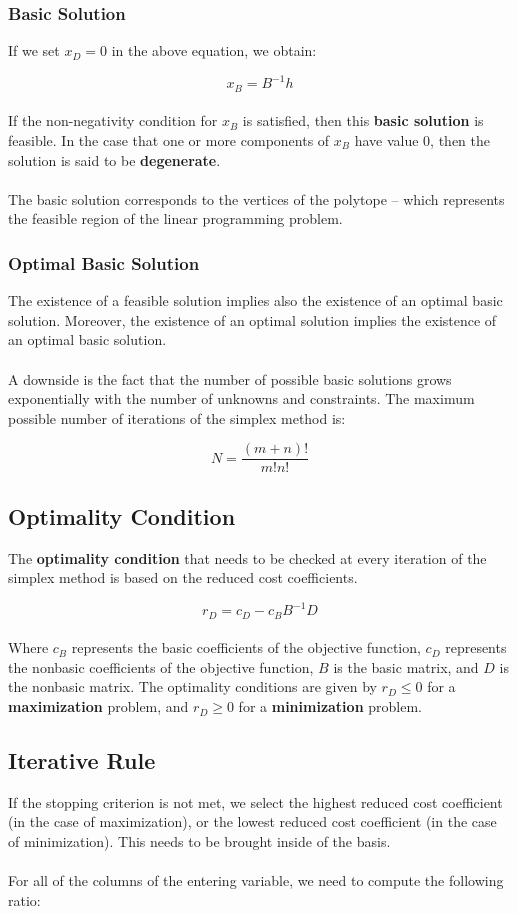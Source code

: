 \documentclass{article}
\begin{document}
\subsubsection{Basic Solution}
If we set $x_D = 0$ in the above equation, we obtain:

\[ x_B = B^{-1}h \] \\
If the non-negativity condition for $x_B$ is satisfied, then this \textbf{basic solution} is feasible. In the case that one or more components of $x_B$ have value 0, then the solution is said to be \textbf{degenerate}. \\ \\
The basic solution corresponds to the vertices of the polytope -- which represents the feasible region of the linear programming problem.

\subsubsection{Optimal Basic Solution}
The existence of a feasible solution implies also the existence of an optimal basic solution. Moreover, the existence of an optimal solution implies the existence of an optimal basic solution. \\ \\
A downside is the fact that the number of possible basic solutions grows exponentially with the number of unknowns and constraints. The maximum possible number of iterations of the simplex method is:

\[ N = \frac{(m + n)!}{m!n!} \]

\subsection{Optimality Condition}
The \textbf{optimality condition} that needs to be checked at every iteration of the simplex method is based on the reduced cost coefficients.

\[ r_D = c_D - c_B B^{-1}D \] \\
Where $c_B$ represents the basic coefficients of the objective function, $c_D$ represents the nonbasic coefficients of the objective function, $B$ is the basic matrix, and $D$ is the nonbasic matrix. The optimality conditions are given by $r_D \leq 0$ for a \textbf{maximization} problem, and $r_D \geq 0$ for a \textbf{minimization} problem.

\subsection{Iterative Rule}
If the stopping criterion is not met, we select the highest reduced cost coefficient (in the case of maximization), or the lowest reduced cost coefficient (in the case of minimization). This needs to be brought inside of the basis. \\ \\
For all of the columns of the entering variable, we need to compute the following ratio:
\end{document}
